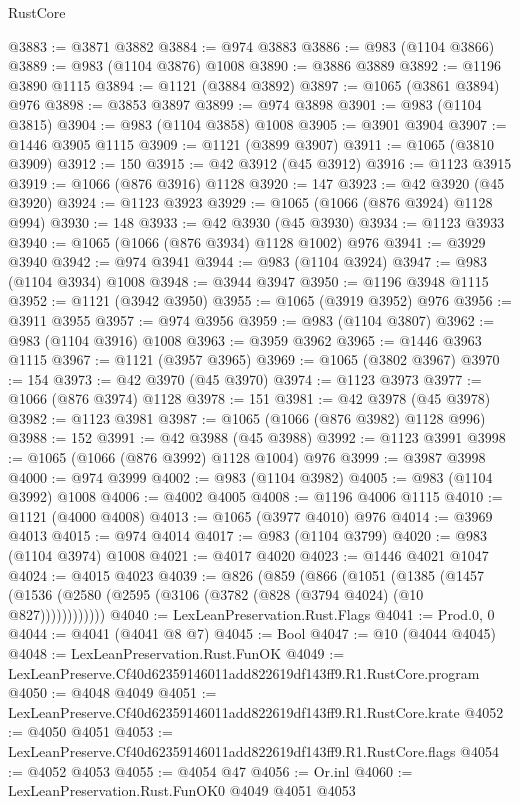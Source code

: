 \begin{lexlean}{RustCore}
\begin{coremodule}
@3883 := @3871 @3882
@3884 := @974 @3883
@3886 := @983 (@1104 @3866)
@3889 := @983 (@1104 @3876) @1008
@3890 := @3886 @3889
@3892 := @1196 @3890 @1115
@3894 := @1121 (@3884 @3892)
@3897 := @1065 (@3861 @3894) @976
@3898 := @3853 @3897
@3899 := @974 @3898
@3901 := @983 (@1104 @3815)
@3904 := @983 (@1104 @3858) @1008
@3905 := @3901 @3904
@3907 := @1446 @3905 @1115
@3909 := @1121 (@3899 @3907)
@3911 := @1065 (@3810 @3909)
@3912 := 150
@3915 := @42 @3912 (@45 @3912)
@3916 := @1123 @3915
@3919 := @1066 (@876 @3916) @1128
@3920 := 147
@3923 := @42 @3920 (@45 @3920)
@3924 := @1123 @3923
@3929 := @1065 (@1066 (@876 @3924) @1128 @994)
@3930 := 148
@3933 := @42 @3930 (@45 @3930)
@3934 := @1123 @3933
@3940 := @1065 (@1066 (@876 @3934) @1128 @1002) @976
@3941 := @3929 @3940
@3942 := @974 @3941
@3944 := @983 (@1104 @3924)
@3947 := @983 (@1104 @3934) @1008
@3948 := @3944 @3947
@3950 := @1196 @3948 @1115
@3952 := @1121 (@3942 @3950)
@3955 := @1065 (@3919 @3952) @976
@3956 := @3911 @3955
@3957 := @974 @3956
@3959 := @983 (@1104 @3807)
@3962 := @983 (@1104 @3916) @1008
@3963 := @3959 @3962
@3965 := @1446 @3963 @1115
@3967 := @1121 (@3957 @3965)
@3969 := @1065 (@3802 @3967)
@3970 := 154
@3973 := @42 @3970 (@45 @3970)
@3974 := @1123 @3973
@3977 := @1066 (@876 @3974) @1128
@3978 := 151
@3981 := @42 @3978 (@45 @3978)
@3982 := @1123 @3981
@3987 := @1065 (@1066 (@876 @3982) @1128 @996)
@3988 := 152
@3991 := @42 @3988 (@45 @3988)
@3992 := @1123 @3991
@3998 := @1065 (@1066 (@876 @3992) @1128 @1004) @976
@3999 := @3987 @3998
@4000 := @974 @3999
@4002 := @983 (@1104 @3982)
@4005 := @983 (@1104 @3992) @1008
@4006 := @4002 @4005
@4008 := @1196 @4006 @1115
@4010 := @1121 (@4000 @4008)
@4013 := @1065 (@3977 @4010) @976
@4014 := @3969 @4013
@4015 := @974 @4014
@4017 := @983 (@1104 @3799)
@4020 := @983 (@1104 @3974) @1008
@4021 := @4017 @4020
@4023 := @1446 @4021 @1047
@4024 := @4015 @4023
@4039 := @826
    (@859
      (@866
        (@1051
          (@1385 (@1457 (@1536 (@2580 (@2595 (@3106 (@3782 (@828 (@3794 @4024) (@10 @827))))))))))))
@4040 := LexLeanPreservation.Rust.Flags
@4041 := Prod.{0, 0}
@4044 := @4041 (@4041 @8 @7)
@4045 := Bool
@4047 := @10 (@4044 @4045)
@4048 := LexLeanPreservation.Rust.FunOK
@4049 := LexLeanPreserve.Cf40d62359146011add822619df143ff9.R1.RustCore.program
@4050 := @4048 @4049
@4051 := LexLeanPreserve.Cf40d62359146011add822619df143ff9.R1.RustCore.krate
@4052 := @4050 @4051
@4053 := LexLeanPreserve.Cf40d62359146011add822619df143ff9.R1.RustCore.flags
@4054 := @4052 @4053
@4055 := @4054 @47
@4056 := Or.inl
@4060 := LexLeanPreservation.Rust.FunOK0 @4049 @4051 @4053

\end{coremodule}
\end{lexlean}
